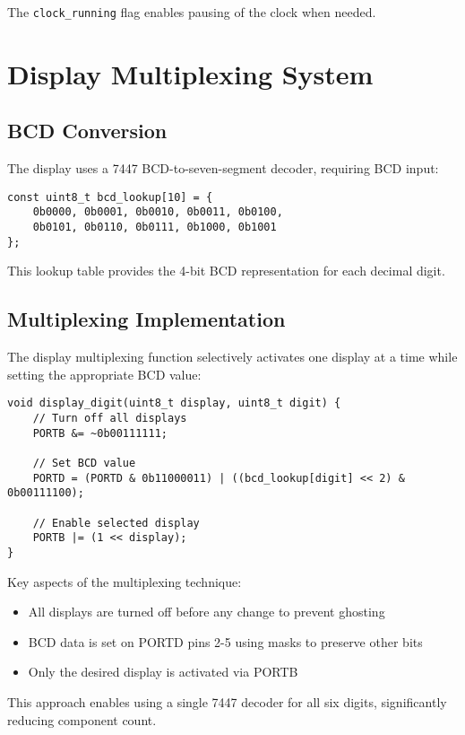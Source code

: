 \documentclass[12pt,a4paper]{article}
\begin{document}
The \texttt{clock\_running} flag enables pausing of the clock when needed.

\section{Display Multiplexing System}

\subsection{BCD Conversion}

The display uses a 7447 BCD-to-seven-segment decoder, requiring BCD input:

\begin{lstlisting}
const uint8_t bcd_lookup[10] = {
    0b0000, 0b0001, 0b0010, 0b0011, 0b0100,
    0b0101, 0b0110, 0b0111, 0b1000, 0b1001
};
\end{lstlisting}

This lookup table provides the 4-bit BCD representation for each decimal digit.

\subsection{Multiplexing Implementation}

The display multiplexing function selectively activates one display at a time while setting the appropriate BCD value:

\begin{lstlisting}
void display_digit(uint8_t display, uint8_t digit) {
    // Turn off all displays
    PORTB &= ~0b00111111;
    
    // Set BCD value
    PORTD = (PORTD & 0b11000011) | ((bcd_lookup[digit] << 2) & 0b00111100);
    
    // Enable selected display
    PORTB |= (1 << display);
}
\end{lstlisting}

Key aspects of the multiplexing technique:
\begin{itemize}
    \item All displays are turned off before any change to prevent ghosting
    \item BCD data is set on PORTD pins 2-5 using masks to preserve other bits
    \item Only the desired display is activated via PORTB
\end{itemize}

This approach enables using a single 7447 decoder for all six digits, significantly reducing component count.
\end{document}
